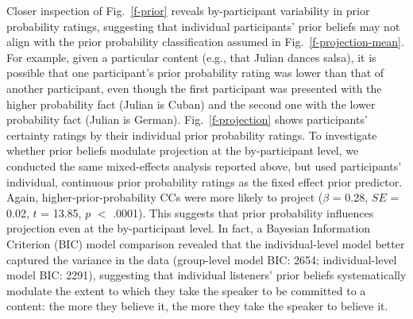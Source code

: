 \documentclass[11pt,fleqn]{article}
\newcommand{\figref}[1]{Fig.~\ref{#1}}
\newcommand{\6}{\mbox{$[\hspace*{-.6mm}[$}}
\newcommand{\9}{\mbox{$]\hspace*{-.6mm}]$}}
\begin{document}
Closer inspection of  \figref{f-prior} reveals by-participant variability in prior probability ratings, suggesting that individual participants' prior beliefs may not align with the prior probability classification assumed in  \figref{f-projection-mean}. For example, given a particular content (e.g., that Julian dances salsa), it is possible that one participant's prior probability rating was lower than that of another participant, even though the first participant was presented with the higher probability fact (Julian is Cuban) and the second one with the lower probability fact (Julian is German). \figref{f-projection} shows participants' certainty ratings by their individual prior probability ratings. %
To investigate whether prior beliefs modulate projection at the by-participant level,  we conducted the same mixed-effects analysis reported above, but used participants' individual, continuous prior probability ratings as the fixed effect prior predictor. Again, higher-prior-probability CCs were more likely to project ($\beta$ = 0.28, $SE$ = 0.02, $t$ = 13.85, $p$ $<$ .0001). This  suggests that prior probability influences projection even at the by-participant level. In fact, a Bayesian Information Criterion (BIC) model comparison  revealed that the individual-level model better captured the variance in the data (group-level model BIC: 2654; individual-level model BIC: 2291), suggesting that individual listeners' prior beliefs systematically modulate the extent to which they take the speaker to be committed to a content: the more they believe it, the more they take the speaker to believe it.
\end{document}
